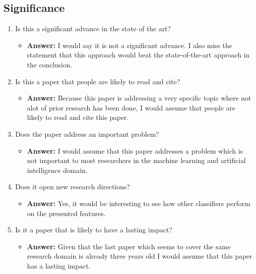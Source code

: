 \documentclass[a4paper]{article}
\begin{document}
\subsection{Significance}

\begin{enumerate}[label=(\alph*)]
	\item Is this a significant advance in the state of the art?
		\begin{itemize}
			\item \textbf{Answer:} I would say it is not a significant advance. I also miss the statement that this approach would beat the state-of-the-art approach in the conclusion.
		\end{itemize}			
	
	\item Is this a paper that people are likely to read and cite?
		\begin{itemize}
			\item \textbf{Answer:} Because this paper is addressing a very specific topic where not alot of prior research has been done, I would assume that people are likely to read and cite this paper. 
		\end{itemize}			
	
	\item Does the paper address an important problem?
		\begin{itemize}
			\item \textbf{Answer:} I would assume that this paper addresses a problem which is not important to most researchers in the machine learning and artificial intelligence domain.
		\end{itemize}			
	
	\item Does it open new research directions?
		\begin{itemize}
			\item \textbf{Answer:} Yes, it would be interesting to see how other classifiers perform on the presented features.
		\end{itemize}			
	
	\item Is it a paper that is likely to have a lasting impact?
		\begin{itemize}
			\item \textbf{Answer:} Given that the last paper which seems to cover the same research domain is already three years old I would assume that this paper has a lasting impact.
		\end{itemize}		
\end{enumerate}
\end{document}
